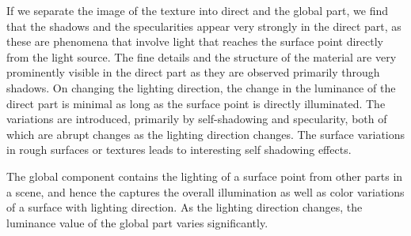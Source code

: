 


If we separate the image of the texture into direct and the global part, we find
that the shadows and the specularities appear very strongly in the direct part,
as these are phenomena that involve light that reaches the surface point
directly from the light source. The fine details and the structure of the
material are very prominently visible in the direct part as they are observed
primarily through shadows. On changing the lighting direction, the change in the
luminance of the direct part is minimal as long as the surface point is directly
illuminated. The variations are introduced, primarily by self-shadowing and
specularity, both of which are abrupt changes as the lighting direction changes.
The surface variations in rough surfaces or textures leads to interesting 
self shadowing effects.

The global component contains the lighting of a surface point from other
parts in a scene, and hence the captures the overall illumination as well as
color variations of a surface with lighting direction. As the lighting direction
changes, the luminance value of the global part varies significantly.

